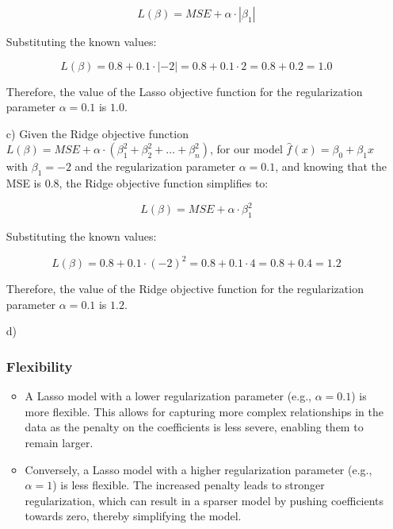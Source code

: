 \documentclass{article}
\begin{document}
\begin{itemize}
        \[
        L(\beta) = MSE + \alpha \cdot \left|\beta_1\right|
        \]
        
        Substituting the known values:
        
        \[
        L(\beta) = 0.8 + 0.1 \cdot \left|-2\right| = 0.8 + 0.1 \cdot 2 = 0.8 + 0.2 = 1.0
        \]
        
        Therefore, the value of the Lasso objective function for the regularization parameter $\alpha = 0.1$ is $1.0$.

    \item[c)]
        Given the Ridge objective function $L(\beta) = MSE + \alpha \cdot (\beta_1^2 + \beta_2^2 + \ldots + \beta_n^2)$, for our model $\hat{f}(x) = \beta_0 + \beta_1x$ with $\beta_1 = -2$ and the regularization parameter $\alpha = 0.1$, and knowing that the MSE is $0.8$, the Ridge objective function simplifies to:

        \[
        L(\beta) = MSE + \alpha \cdot \beta_1^2
        \]
        
        Substituting the known values:
        
        \[
        L(\beta) = 0.8 + 0.1 \cdot (-2)^2 = 0.8 + 0.1 \cdot 4 = 0.8 + 0.4 = 1.2
        \]
        
        Therefore, the value of the Ridge objective function for the regularization parameter $\alpha = 0.1$ is $1.2$.

    \item[d)] 
    \subsubsection*{Flexibility}
    \begin{itemize}
        \item A Lasso model with a lower regularization parameter (e.g., $\alpha = 0.1$) is more flexible. This allows for capturing more complex relationships in the data as the penalty on the coefficients is less severe, enabling them to remain larger.
        \item Conversely, a Lasso model with a higher regularization parameter (e.g., $\alpha = 1$) is less flexible. The increased penalty leads to stronger regularization, which can result in a sparser model by pushing coefficients towards zero, thereby simplifying the model.
    \end{itemize}
    

\end{itemize}
\end{document}
